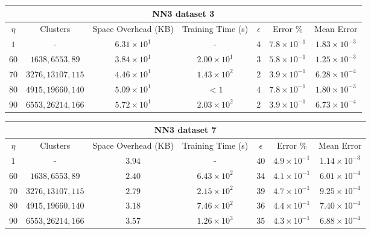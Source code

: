 \par\null\par
\par\null\par

\pagebreak

\begin{adjustwidth}{-1.5cm}{}
\begin{tabular}{ccccccc}
\hline
\multicolumn{7}{c}{NN3 dataset 3} \\
\toprule
$\eta$ & Clusters & Space Overhead (KB) & Training Time (s) & $\epsilon$ & Error \% & Mean Error\\
\midrule
$1$ & - & $6.31 \times 10^1$ & - & $4$ & $7.8 \times 10^{-1}$ & $1.83 \times 10^{-3}$\\
$60$ & $1638, 6553, 89$ & $3.84 \times 10^1$ & $2.00 \times 10^1$ & $3$ & $5.8 \times 10^{-1}$ & $1.25 \times 10^{-3}$\\
$70$ & $3276, 13107, 115$ & $4.46 \times 10^1$ & $1.43 \times 10^2$ & $2$ & $3.9 \times 10^{-1}$ & $6.28 \times 10^{-4}$\\
$80$ & $4915, 19660, 140$ & $5.09 \times 10^1$ & $<1$ & $4$ & $7.8 \times 10^{-1}$ & $1.80 \times 10^{-3}$\\
$90$ & $6553, 26214, 166$ & $5.72 \times 10^1$ & $2.03 \times 10^2$ & $2$ & $3.9 \times 10^{-1}$ & $6.73 \times 10^{-4}$\\
\bottomrule
\end{tabular}
\end{adjustwidth}

\par\null\par
\par\null\par

\begin{adjustwidth}{-1.5cm}{}
\begin{tabular}{ccccccc}
\hline
\multicolumn{7}{c}{NN3 dataset 7} \\
\toprule
$\eta$ & Clusters & Space Overhead (KB) & Training Time (s) & $\epsilon$ & Error \% & Mean Error\\
\midrule
$1$  & - & $3.94$ & - & $40$ & $4.9 \times 10^{-1}$ & $1.14 \times 10^{-3}$\\
$60$ & $1638, 6553, 89$ & $2.40$ & $6.43 \times 10^2$ & $34$ & $4.1 \times 10^{-1}$ & $6.01 \times 10^{-4}$\\
$70$ & $3276, 13107, 115$ & $2.79$ & $2.15 \times 10^2$ & $39$ & $4.7 \times 10^{-1}$ & $9.25 \times 10^{-4}$\\
$80$ & $4915, 19660, 140$ & $3.18$ & $7.46 \times 10^2$ & $36$ & $4.4 \times 10^{-1}$ & $7.40 \times 10^{-4}$\\
$90$ & $6553, 26214, 166$ & $3.57$ & $1.26 \times 10^3$ & $35$ & $4.3 \times 10^{-1}$ & $6.88 \times 10^{-4}$\\
\bottomrule
\end{tabular}
\end{adjustwidth}


